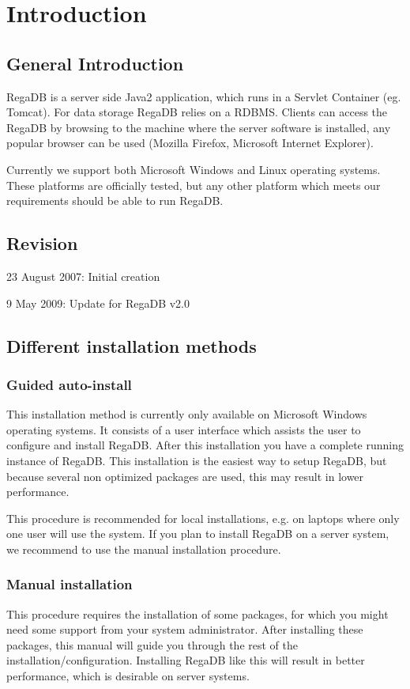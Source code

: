 \chapter{Introduction}
\label{chapter:introduction}

\section{General Introduction}

RegaDB is a server side Java2 application, which runs in a Servlet Container (eg. Tomcat). For data storage RegaDB relies on a RDBMS. Clients can access the RegaDB by browsing to the machine where the server software is installed, any popular browser can be used (Mozilla Firefox, Microsoft Internet Explorer).

Currently we support both Microsoft Windows and Linux operating systems. These platforms are officially tested, but any other platform which meets our requirements should be able to run RegaDB.

\section{Revision}
23 August 2007: Initial creation

9 May 2009: Update for RegaDB v2.0

\section{Different installation methods}
\subsection{Guided auto-install}
This installation method is currently only available on Microsoft Windows operating systems. It consists of a user interface which assists the user to configure and install RegaDB. After this installation you have a complete running instance of RegaDB. This installation is the easiest way to setup RegaDB, but because several non optimized packages are used, this may result in lower performance.

This procedure is recommended for local installations, e.g. on laptops where only one user will use the system. If you plan to install RegaDB on a server system, we recommend to use the manual installation procedure.

\subsection{Manual installation}
This procedure requires the installation of some packages, for which you might need some support from your system administrator. After installing these packages, this manual will guide you through the rest of the installation/configuration. Installing RegaDB like this will result in better performance, which is desirable on server systems.

